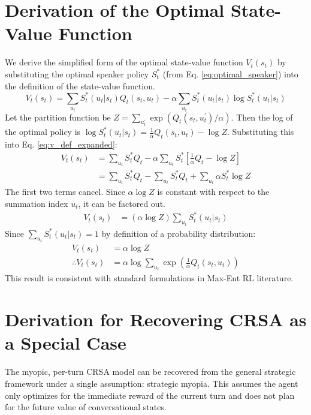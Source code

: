 \documentclass[12pt, a4paper]{report}
\begin{document}
\chapter{Derivation of the Optimal State-Value Function}
\label{sec:v_derivation}
We derive the simplified form of the optimal state-value function $V_{t}(s_{t})$ by substituting the optimal speaker policy $S_{t}^{*}$ (from Eq. \ref{eq:optimal_speaker}) into the definition of the state-value function.
\begin{equation}
V_{t}(s_{t})=\sum_{u_{t}}S_{t}^{*}(u_{t}|s_{t})Q_{t}(s_{t},u_{t})-\alpha\sum_{u_{t}}S_{t}^{*}(u_{t}|s_{t})\log S_{t}^{*}(u_{t}|s_{t}) \label{eq:v_def_expanded}
\end{equation}
Let the partition function be $Z=\sum_{u_{t}^{\prime}}\exp(Q_{t}(s_{t},u_{t}^{\prime})/\alpha)$. Then the log of the optimal policy is $\log S_{t}^{*}(u_{t}|s_{t})=\frac{1}{\alpha}Q_{t}(s_{t},u_{t})-\log Z$. Substituting this into Eq. \ref{eq:v_def_expanded}:
\begin{align*}
V_{t}(s_{t}) &= \sum_{u_{t}}S_{t}^{*}Q_{t} - \alpha\sum_{u_{t}}S_{t}^{*}\left[\frac{1}{\alpha}Q_{t}-\log Z\right] \\
&= \sum_{u_{t}}S_{t}^{*}Q_{t} - \sum_{u_{t}}S_{t}^{*}Q_{t} + \sum_{u_{t}}\alpha S_{t}^{*}\log Z \tag{by distribution}
\end{align*}
The first two terms cancel. Since $\alpha \log Z$ is constant with respect to the summation index $u_t$, it can be factored out.
\begin{align*}
V_{t}(s_{t}) &= (\alpha \log Z) \sum_{u_{t}}S_{t}^{*}(u_{t}|s_{t}) \text{}
\end{align*}
Since $\sum_{u_{t}}S_{t}^{*}(u_{t}|s_{t})=1$ by definition of a probability distribution:
\begin{align*}
V_{t}(s_{t}) &= \alpha \log Z \text{}\\
\therefore V_{t}(s_{t}) &= \alpha \log\sum_{u_{t}}\exp\left(\frac{1}{\alpha}Q_{t}(s_{t},u_{t})\right) \label{eq:v_final} \text{}
\end{align*}
This result is consistent with standard formulations in Max-Ent RL literature.

\chapter{Derivation for Recovering CRSA as a Special Case}
\label{sec:crsa_derivation}
The myopic, per-turn CRSA model can be recovered from the general strategic framework under a single assumption: strategic myopia. This assumes the agent only optimizes for the immediate reward of the current turn and does not plan for the future value of conversational states.
\end{document}
